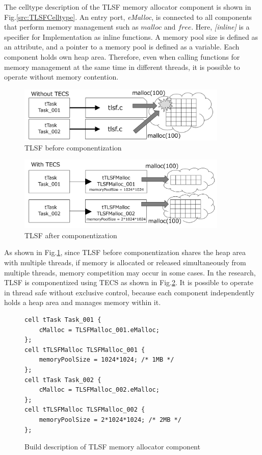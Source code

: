 \documentclass[a4j,12pt,oneside,openany,english]{jsbook}
\begin{document}
The celltype description of the TLSF memory allocator component is shown in Fig.\ref{src:TLSFCelltype}.
An entry port, {\it eMalloc}, is connected to all components that perform memory management such as $malloc$ and $free$.
Here, {\it [inline]} is a specifier for Implementation as inline functions.
A memory pool size is defined as an attribute, and a pointer to a memory pool is defined as a variable.
Each component holds own heap area.
Therefore, even when calling functions for memory management at the same time in different threads, it is possible to operate without memory contention.

\begin{figure}[t]
    \centering
    \includegraphics[width=10cm,clip]{figure/WithoutTECS.pdf}
    \caption{TLSF before componentization}
    \label{fig:WithoutTECS}
\end{figure}

\begin{figure}[t]
    \centering
    \includegraphics[width=10cm,clip]{figure/WithTECS.pdf}
    \caption{TLSF after componentization}
    \label{fig:WithTECS}
\end{figure}

As shown in Fig.\ref{fig:WithoutTECS}, since TLSF before componentization shares the heap area with multiple threads, if memory is allocated or released simultaneously from multiple threads, memory competition may occur in some cases.
In the research, TLSF is componentized using TECS as shown in Fig.\ref{fig:WithTECS}.
It is possible to operate in thread safe without exclusive control, because each component independently holds a heap area and manages memory within it. 

\begin{figure}[t]
\centering
\begin{lstlisting}
cell tTask Task_001 {
    cMalloc = TLSFMalloc_001.eMalloc;
};
cell tTLSFMalloc TLSFMalloc_001 {
    memoryPoolSize = 1024*1024; /* 1MB */
};
cell tTask Task_002 {
    cMalloc = TLSFMalloc_002.eMalloc;
};
cell tTLSFMalloc TLSFMalloc_002 {
    memoryPoolSize = 2*1024*1024; /* 2MB */
};
\end{lstlisting}
\caption{Build description of TLSF memory allocator component}
\label{src:TLSFBuild}
\end{figure}
\end{document}
